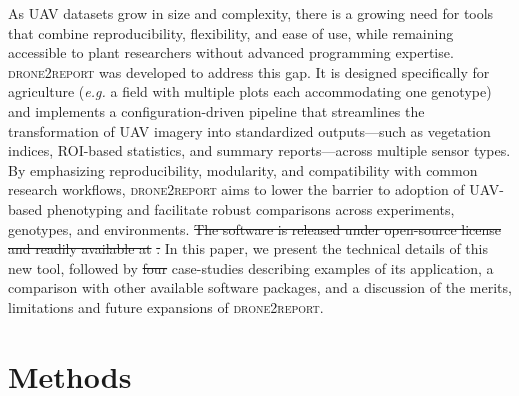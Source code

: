 \documentclass[drones,technicalnote,accept,pdftex,moreauthors]{Definitions/mdpi}
\providecommand{\DIFadd}[1]{{\protect\color{blue}\uwave{#1}}} %
\providecommand{\DIFdel}[1]{{\protect\color{red}\sout{#1}}}                      %
\providecommand{\DIFaddbegin}{} %
\providecommand{\DIFaddend}{} %
\providecommand{\DIFdelbegin}{} %
\providecommand{\DIFdelend}{} %
\newcommand{\DIFscaledelfig}{0.5}
\newlength{\DIFdelgraphicswidth} %
\newlength{\DIFdelgraphicsheight} %
\newcommand{\DIFaddincludegraphics}[2][]{{\color{blue}\fbox{\DIFOincludegraphics[#1]{#2}}}} %
\newcommand{\DIFdelincludegraphics}[2][]{%
\sbox{\DIFdelgraphicsbox}{\DIFOincludegraphics[#1]{#2}}%
\settoboxwidth{\DIFdelgraphicswidth}{\DIFdelgraphicsbox} %
\settoboxtotalheight{\DIFdelgraphicsheight}{\DIFdelgraphicsbox} %
\scalebox{\DIFscaledelfig}{%
\parbox[b]{\DIFdelgraphicswidth}{\usebox{\DIFdelgraphicsbox}\\[-\baselineskip] \rule{\DIFdelgraphicswidth}{0em}}\llap{\resizebox{\DIFdelgraphicswidth}{\DIFdelgraphicsheight}{%
\setlength{\unitlength}{\DIFdelgraphicswidth}%
\begin{picture}(1,1)%
\thicklines\linethickness{2pt} %
{\color[rgb]{1,0,0}\put(0,0){\framebox(1,1){}}}%
{\color[rgb]{1,0,0}\put(0,0){\line( 1,1){1}}}%
{\color[rgb]{1,0,0}\put(0,1){\line(1,-1){1}}}%
\end{picture}%
}\hspace*{3pt}}} %
} %
\DeclareRobustCommand{\DIFaddbegin}{\DIFOaddbegin \let\includegraphics\DIFaddincludegraphics} %
\DeclareRobustCommand{\DIFaddend}{\DIFOaddend \let\includegraphics\DIFOincludegraphics} %
\DeclareRobustCommand{\DIFdelbegin}{\DIFOdelbegin \let\includegraphics\DIFdelincludegraphics} %
\DeclareRobustCommand{\DIFdelend}{\DIFOaddend \let\includegraphics\DIFOincludegraphics} %
\begin{document}
\DIFaddend As UAV datasets grow in size and complexity, there is a growing need for tools that combine reproducibility, flexibility, and ease of use, while remaining accessible to plant researchers without advanced programming expertise.
\textsc{drone2report} was developed to address this gap. It is designed specifically for agriculture (\textit{e.g.} a field with multiple plots each accommodating one genotype) and implements a configuration-driven pipeline that streamlines the transformation of UAV imagery into standardized outputs—such as vegetation indices, ROI-based statistics, and summary reports—across multiple sensor types. By emphasizing reproducibility, modularity, and compatibility with common research workflows, \textsc{drone2report} aims to lower the barrier to adoption of UAV-based phenotyping and facilitate robust comparisons across experiments, genotypes, and environments. 
\DIFdelbegin \DIFdel{The software is released under open-source license and readily available at }%
\DIFdel{. 
}\DIFdelend %
In this paper, we present the technical details of this new tool, followed by \DIFdelbegin \DIFdel{four }\DIFdelend \DIFaddbegin \DIFadd{five }\DIFaddend case-studies describing examples of its application, a comparison with other available software packages, and a discussion of the merits, limitations and future expansions of \textsc{drone2report}.

\section{Methods}
\label{methods}
\end{document}

